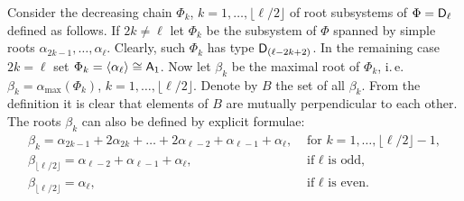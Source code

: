 
Consider the decreasing chain $\Phi_k$, $k=1,\ldots, \lfloor \ell/2 \rfloor$ of root subsystems of $\Phi=\mathsf{D}_\ell$ defined as follows.
If $2k \neq \ell$ let $\Phi_k$ be the subsystem of $\Phi$ spanned by simple roots $\alpha_{2k-1}, \ldots, \alpha_\ell$.
Clearly, such $\Phi_k$ has type $\mathsf{D}_{(\ell-2k+2)}$. 
In the remaining case $2k = \ell$ set $\Phi_k = \langle \alpha_\ell \rangle \cong \mathsf{A}_1$.
Now let $\beta_k$ be the maximal root of $\Phi_k$, i.\,e. $\beta_k = \alpha_\mathrm{max}(\Phi_k)$, $k=1,\ldots, \lfloor \ell/2 \rfloor$.
Denote by $B$ the set of all $\beta_k$. From the definition it is clear that elements of $B$ are mutually perpendicular to each other.
The roots $\beta_k$ can also be defined by explicit formulae:
\begin{align*}
 \beta_k =  \alpha_{2k-1} + 2\alpha_{2k}+ \ldots + 2\alpha_{\ell-2} + \alpha_{\ell-1} + \alpha_\ell, & \text{ for } k=1,\ldots,\lfloor\ell/2\rfloor-1, \\
 \beta_{\lfloor\ell/2\rfloor} = \alpha_{\ell-2}+\alpha_{\ell-1}+\alpha_\ell, & \text{ if $\ell$ is odd,} \\
 \beta_{\lfloor\ell/2\rfloor} = \alpha_\ell, & \text{ if $\ell$ is even.}
\end{align*}

